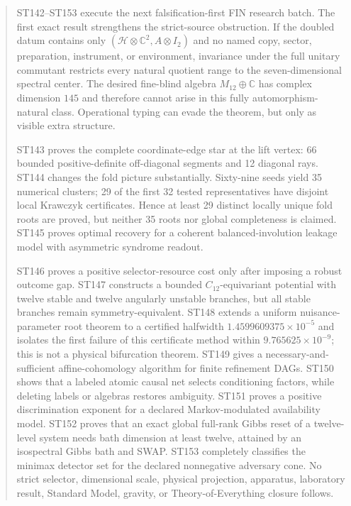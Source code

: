 \documentclass[11pt,a4paper]{article}
\begin{document}
\begin{abstract}
ST142--ST153 execute the next falsification-first FIN research batch. The first exact result strengthens the strict-source obstruction. If the doubled datum contains only $(\mathcal H\otimes\mathbb C^2,A\otimes I_2)$ and no named copy, sector, preparation, instrument, or environment, invariance under the full unitary commutant restricts every natural quotient range to the seven-dimensional spectral center. The desired fine-blind algebra $M_{12}\oplus\mathbb C$ has complex dimension $145$ and therefore cannot arise in this fully automorphism-natural class. Operational typing can evade the theorem, but only as visible extra structure.

ST143 proves the complete coordinate-edge star at the lift vertex: 66 bounded positive-definite off-diagonal segments and 12 diagonal rays. ST144 changes the fold picture substantially. Sixty-nine seeds yield 35 numerical clusters; 29 of the first 32 tested representatives have disjoint local Krawczyk certificates. Hence at least 29 distinct locally unique fold roots are proved, but neither 35 roots nor global completeness is claimed. ST145 proves optimal recovery for a coherent balanced-involution leakage model with asymmetric syndrome readout.

ST146 proves a positive selector-resource cost only after imposing a robust outcome gap. ST147 constructs a bounded $C_{12}$-equivariant potential with twelve stable and twelve angularly unstable branches, but all stable branches remain symmetry-equivalent. ST148 extends a uniform nuisance-parameter root theorem to a certified halfwidth $1.4599609375\times10^{-5}$ and isolates the first failure of this certificate method within $9.765625\times10^{-9}$; this is not a physical bifurcation theorem. ST149 gives a necessary-and-sufficient affine-cohomology algorithm for finite refinement DAGs. ST150 shows that a labeled atomic causal net selects conditioning factors, while deleting labels or algebras restores ambiguity. ST151 proves a positive discrimination exponent for a declared Markov-modulated availability model. ST152 proves that an exact global full-rank Gibbs reset of a twelve-level system needs bath dimension at least twelve, attained by an isospectral Gibbs bath and SWAP. ST153 completely classifies the minimax detector set for the declared nonnegative adversary cone. No strict selector, dimensional scale, physical projection, apparatus, laboratory result, Standard Model, gravity, or Theory-of-Everything closure follows.
\end{abstract}
\end{document}
